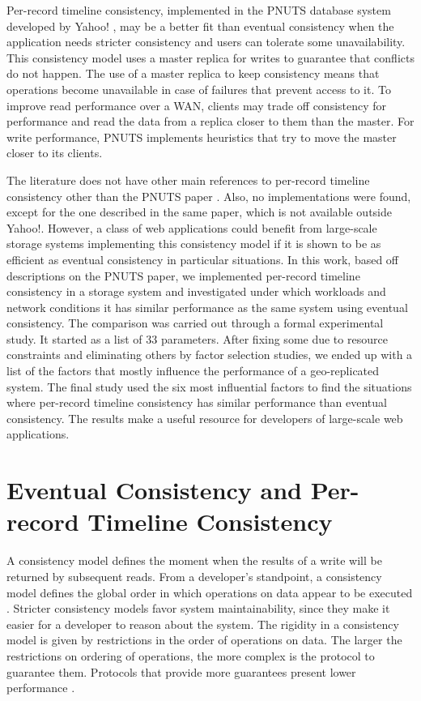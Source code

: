 \documentclass[man,floatsintext,12pt]{apa6}
\begin{document}
Per-record timeline consistency, implemented in the PNUTS database system
developed by Yahoo! \parencite{Cooper2008}, may be a better fit than eventual
consistency when the application needs stricter consistency and users can
tolerate some unavailability. This consistency model uses a master replica for
writes to guarantee that conflicts do not happen. The use of a master replica
to keep consistency means that operations become unavailable in case of
failures that prevent access to it. To improve read performance over a WAN,
clients may trade off consistency for performance and read the data from a
replica closer to them than the master. For write performance, PNUTS implements
heuristics that try to move the master closer to its clients.

The literature does not have other main references to per-record timeline
consistency other than the PNUTS paper \parencite{Cooper2008}. Also, no
implementations were found, except for the one described in the same paper,
which is not available outside Yahoo!. However, a class of web applications
could benefit from large-scale storage systems implementing this consistency
model if it is shown to be as efficient as eventual consistency in particular
situations. In this work, based off descriptions on the PNUTS paper, we
implemented per-record timeline consistency in a storage system and
investigated under which workloads and network conditions it has similar
performance as the same system using eventual consistency. The comparison was
carried out through a formal experimental study. It started as a list of 33
parameters. After fixing some due to resource constraints and eliminating
others by factor selection studies, we ended up with a list of the factors that
mostly influence the performance of a geo-replicated system. The final study
used the six most influential factors to find the situations where per-record
timeline consistency has similar performance than eventual consistency. The
results make a useful resource for developers of large-scale web applications.

\section{Eventual Consistency and Per-record Timeline Consistency}

A consistency model defines the moment when the results of a write will be
returned by subsequent reads. From a developer's standpoint, a consistency
model defines the global order in which operations on data appear to be
executed \parencite{Adve1995}. Stricter consistency models favor system
maintainability, since they make it easier for a developer to reason about the
system. The rigidity in a consistency model is given by restrictions in the
order of operations on data. The larger the restrictions on ordering of
operations, the more complex is the protocol to guarantee them. Protocols that
provide more guarantees present lower performance \parencite{Mosberger1993}.
\end{document}
